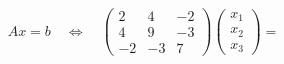 \documentclass[preview]{standalone}
\begin{document}
\begin{align*}
A x = b \quad \Leftrightarrow \quad\begin{pmatrix}2 & 4 & -2\\ 4 & 9 & -3\\ -2 & -3 & 7\end{pmatrix}\begin{pmatrix}x_1\\x_2\\x_3\end{pmatrix}=
\end{align*}
\end{document}
